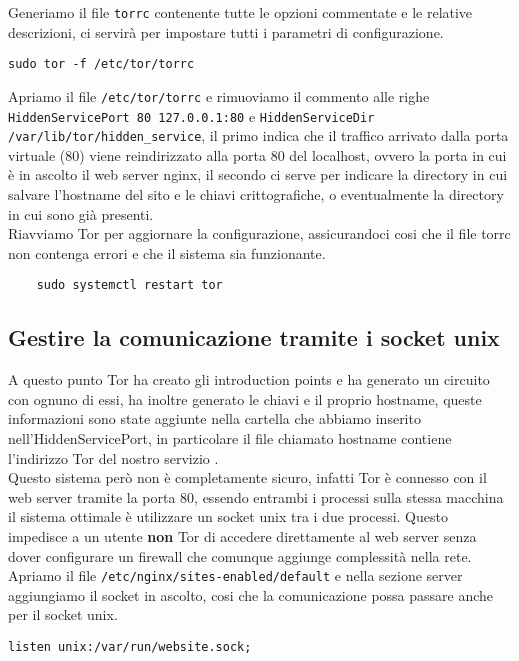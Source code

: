 \cite{TorRepo}

Generiamo il file \lstinline{torrc} contenente tutte le opzioni commentate e le relative descrizioni, ci servirà per impostare tutti i parametri di configurazione. 
\begin{lstlisting}[caption={Generazione file torrc}]
    sudo tor -f /etc/tor/torrc
\end{lstlisting}

Apriamo il file \lstinline{/etc/tor/torrc} e rimuoviamo il commento alle righe \lstinline{HiddenServicePort 80 127.0.0.1:80} e \lstinline{HiddenServiceDir /var/lib/tor/hidden_service}, il primo indica che il traffico arrivato dalla porta virtuale (80) viene reindirizzato alla porta 80 del localhost, ovvero la porta in cui è in ascolto il web server nginx, il secondo ci serve per indicare la directory in cui salvare l'hostname del sito e le chiavi crittografiche, o eventualmente la directory in cui sono già presenti. \\

Riavviamo Tor per aggiornare la configurazione, assicurandoci cosi che il file torrc non contenga errori e che il sistema sia funzionante.
\begin{lstlisting}
    sudo systemctl restart tor
\end{lstlisting}

\subsection{Gestire la comunicazione tramite i socket unix}
A questo punto Tor ha creato gli introduction points e ha generato un circuito con ognuno di essi, ha inoltre generato le chiavi e il proprio hostname, queste informazioni sono state aggiunte nella cartella che abbiamo inserito nell'HiddenServicePort, in particolare il file chiamato hostname contiene l'indirizzo Tor del nostro servizio \cite{SetupOnionService}. \\
Questo sistema però non è completamente sicuro, infatti Tor è connesso con il web server tramite la porta 80, essendo entrambi i processi sulla stessa macchina il sistema ottimale è utilizzare un socket unix tra i due processi. 
Questo impedisce a un utente \textbf{non} Tor di accedere direttamente al web server senza dover configurare un firewall che comunque aggiunge complessità nella rete. \\
Apriamo il file \lstinline{/etc/nginx/sites-enabled/default} e nella sezione server aggiungiamo il socket in ascolto, cosi che la comunicazione possa passare anche per il socket unix.
\begin{lstlisting}[caption={Aggiunta/creazione socket unix in nginx}]
    listen unix:/var/run/website.sock;
\end{lstlisting}

